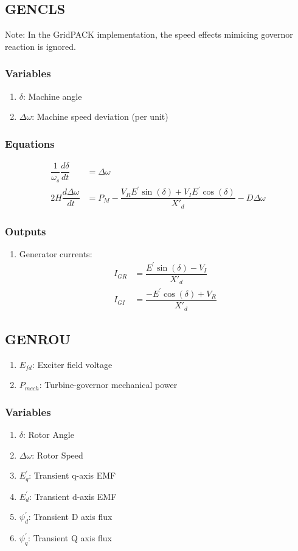 \documentclass[12pt]{article}
\newcommand{\dw}{\Delta\omega}
\newcommand{\Xdp}{X{'}_d}
\newcommand{\Ep}{E^{'}}
\begin{document}
\subsection{GENCLS\cite{GENCLS}}
Note: In the GridPACK implementation, the speed effects mimicing governor reaction is ignored.

\subsubsection{Variables}
\begin{enumerate}
  \item $\delta$: Machine angle
  \item $\dw$: Machine speed deviation (per unit)
\end{enumerate}

\subsubsection{Equations}
\begin{align}
\dfrac{1}{\omega_s}\dfrac{d\delta}{dt} &= \dw \\
2H\dfrac{d\dw}{dt} &= P_M - \dfrac{V_R\Ep\sin(\delta) + V_I\Ep\cos(\delta)}{\Xdp} - D\dw
\end{align}

\subsubsection{Outputs}
\begin{enumerate}
	\item Generator currents:
\begin{align}
  I_{GR} &= \dfrac{\Ep\sin(\delta) - V_I}{\Xdp} \\
  I_{GI} &= \dfrac{-\Ep\cos(\delta) + V_R}{\Xdp}
\end{align}
\end{enumerate}

\subsection{GENROU}

\begin{enumerate}
	\item $E_{fd}$: Exciter field voltage
	\item $P_{mech}$: Turbine-governor mechanical power
\end{enumerate}

\subsubsection{Variables}
\begin{enumerate}
  \item ${\delta}$: Rotor Angle
  \item ${\dw}$: Rotor Speed 
  \item $E^{'}_q$: Transient q-axis EMF
  \item $E^{'}_d$: Transient d-axis EMF
  \item $\psi^{'}_d$: Transient D axis flux
  \item $\psi^{'}_q$: Transient Q axis flux 
\end{enumerate}
\end{document}
